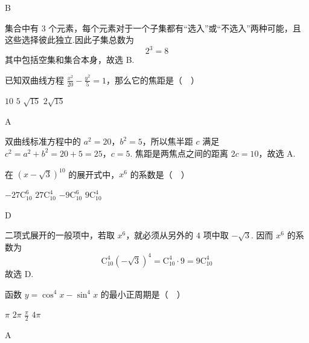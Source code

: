 \begin{answer}
B
\end{answer}

\begin{solution}
集合中有 \(3\) 个元素，每个元素对于一个子集都有“选入”或“不选入”两种可能，且这些选择彼此独立.因此子集总数为
\[
2^3=8
\]
其中包括空集和集合本身，故选 B.
\end{solution}

\begin{problem}

已知双曲线方程 \(\frac{x^2}{20} - \frac{y^2}{5} = 1\)，那么它的焦距是（\(\quad\)）

\choices
    {\(10\)}
    {\(5\)}
    {\(\sqrt{15}\)}
    {\(2\sqrt{15}\)}
\end{problem}

\begin{answer}
A
\end{answer}

\begin{solution}
双曲线标准方程中的 \(a^2=20\)，\(b^2=5\)，所以焦半距 \(c\) 满足
\(c^2=a^2+b^2=20+5=25\)，\(c=5\).
焦距是两焦点之间的距离 \(2c=10\)，故选 A.
\end{solution}

\begin{problem}

在 \((x - \sqrt{3})^10\) 的展开式中，\(x^6\) 的系数是（\(\quad\)）

\choices
    {\(-27\mathrm C_{10}^6\)}
    {\(27\mathrm C_{10}^4\)}
    {\(-9\mathrm C_{10}^6\)}
    {\(9\mathrm C_{10}^4\)}
\end{problem}

\begin{answer}
D
\end{answer}

\begin{solution}
二项式展开的一般项中，若取 \(x^6\)，就必须从另外的 \(4\) 项中取 \(-\sqrt{3}\). 因而 \(x^6\) 的系数为
\[
\mathrm C_{10}^{4}(-\sqrt{3})^4=\mathrm C_{10}^{4}\cdot9=9\mathrm C_{10}^{4}
\]
故选 D.
\end{solution}

\begin{problem}

函数 \(y=\cos^4 x-\sin^4 x\) 的最小正周期是（\(\quad\)）

\choices
    {\(\pi\)}
    {\(2\pi\)}
    {\(\frac{\pi}{2}\)}
    {\(4\pi\)}
\end{problem}

\begin{answer}
A
\end{answer}

